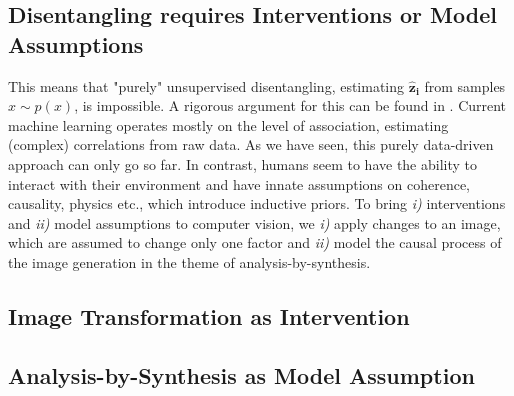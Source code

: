 	\subsection{Disentangling requires Interventions or Model Assumptions}\label{sec:requirements}
		This means that "purely" unsupervised disentangling, \ie estimating $\mathbf{\hat z_i}$ from samples $x \sim p(x)$, is impossible. A rigorous argument for this can be found in \cite{locatello18challenging}.
		Current machine learning operates mostly on the level of association, estimating (complex) correlations from raw data.
		As we have seen, this purely data-driven approach can only go so far.
		In contrast, humans seem to have the ability to interact with their environment and have innate assumptions on coherence, causality, physics etc., which introduce inductive priors.
		To bring \emph{i)} interventions and \emph{ii)} model assumptions to computer vision, we \emph{i)} apply changes to an image, which are assumed to change only one factor and \emph{ii)} model the causal process of the image generation in the theme of analysis-by-synthesis.
%
%
%

	\subsection{Image Transformation as Intervention}

	\subsection{Analysis-by-Synthesis as Model Assumption}

